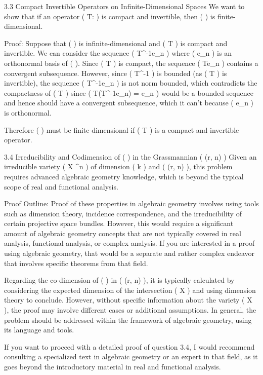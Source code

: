 \documentclass{article}
\begin{document}
3.3 Compact Invertible Operators on Infinite-Dimensional Spaces
We want to show that if an operator ( T:  \rightarrow {} ) is compact and invertible, then (  ) is finite-dimensional.

Proof:
Suppose that (  ) is infinite-dimensional and ( T ) is compact and invertible. We can consider the sequence ( { T^{-1}e_n } ) where ( { e_n } ) is an orthonormal basis of (  ). Since ( T ) is compact, the sequence ( { Te_n } ) contains a convergent subsequence. However, since ( T^{-1} ) is bounded (as ( T ) is invertible), the sequence ( { T^{-1}e_n } ) is not norm bounded, which contradicts the compactness of ( T ) since ( T(T^{-1}e_n) = e_n ) would be a bounded sequence and hence should have a convergent subsequence, which it can't because ( { e_n } ) is orthonormal.

Therefore (  ) must be finite-dimensional if ( T ) is a compact and invertible operator.

3.4 Irreducibility and Codimension of ( \Phi ) in the Grassmannian ( (r, n) )
Given an irreducible variety ( X \subset {}^{n} ) of dimension ( k ) and ( (r, n) ), this problem requires advanced algebraic geometry knowledge, which is beyond the typical scope of real and functional analysis.

Proof Outline:
Proof of these properties in algebraic geometry involves using tools such as dimension theory, incidence correspondence, and the irreducibility of certain projective space bundles. However, this would require a significant amount of algebraic geometry concepts that are not typically covered in real analysis, functional analysis, or complex analysis. If you are interested in a proof using algebraic geometry, that would be a separate and rather complex endeavor that involves specific theorems from that field.

Regarding the co-dimension of ( \Phi ) in ( (r, n) ), it is typically calculated by considering the expected dimension of the intersection ( \Lambda \cap X ) and using dimension theory to conclude. However, without specific information about the variety ( X ), the proof may involve different cases or additional assumptions. In general, the problem should be addressed within the framework of algebraic geometry, using its language and tools.

If you want to proceed with a detailed proof of question 3.4, I would recommend consulting a specialized text in algebraic geometry or an expert in that field, as it goes beyond the introductory material in real and functional analysis.
\end{document}
